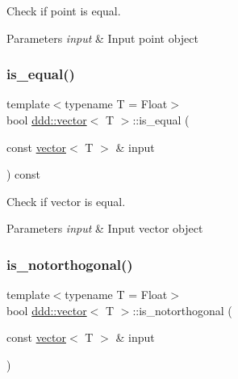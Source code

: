 Check if point is equal. 


\begin{DoxyParams}{Parameters}
{\em input} & Input point object \\
\hline
\end{DoxyParams}
\mbox{\label{classddd_1_1vector_a860847a7c7c93e52b4a83af722eb60f7}} 
\subsubsection{\texorpdfstring{is\+\_\+equal()}{is\_equal()}\hspace{0.1cm}{\footnotesize\ttfamily [2/2]}}
{\footnotesize\ttfamily template$<$typename T = Float$>$ \\
bool \hyperlink{classddd_1_1vector}{ddd\+::vector}$<$ T $>$\+::is\+\_\+equal (\begin{DoxyParamCaption}\item[{const \hyperlink{classddd_1_1vector}{vector}$<$ T $>$ \&}]{input }\end{DoxyParamCaption}) const\hspace{0.3cm}{\ttfamily [inline]}}



Check if vector is equal. 


\begin{DoxyParams}{Parameters}
{\em input} & Input vector object \\
\hline
\end{DoxyParams}
\mbox{\label{classddd_1_1vector_a7f96b8d4f26e95d3678b29ffb434d5e5}} 
\subsubsection{\texorpdfstring{is\+\_\+notorthogonal()}{is\_notorthogonal()}}
{\footnotesize\ttfamily template$<$typename T = Float$>$ \\
bool \hyperlink{classddd_1_1vector}{ddd\+::vector}$<$ T $>$\+::is\+\_\+notorthogonal (\begin{DoxyParamCaption}\item[{const \hyperlink{classddd_1_1vector}{vector}$<$ T $>$ \&}]{input }\end{DoxyParamCaption})\hspace{0.3cm}{\ttfamily [inline]}}



